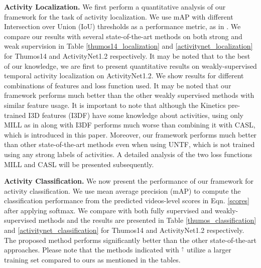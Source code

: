 \documentclass[runningheads]{llncs}
\begin{document}
\textbf{Activity Localization.} We first perform a quantitative analysis of our framework for the task of activity localization. We use mAP with different Intersection over Union (IoU) thresholds as a performance metric, as in \cite{idrees2017thumos}. We compare our results with several state-of-the-art methods on both strong and weak supervision in Table \ref{thumos14_localization} and \ref{activitynet_localization} for Thumos14 and ActivityNet1.2 respectively. It may be noted that to the best of our knowledge, we are first to present quantitative results on weakly-supervised temporal activity localization on ActivityNet1.2. We show results for different combinations of features and loss function used. It may be noted that our framework performs much better than the other weakly supervised methods with similar feature usage. It is important to note that although the Kinetics pre-trained I3D features (I3DF) have some knowledge about activities, using only MILL as in \cite{wang2017untrimmednets} along with I3DF performs much worse than combining it with CASL, which is introduced in this paper. Moreover, our framework performs much better than other state-of-the-art methods even when using UNTF, which is not trained using any strong labels of activities. A detailed analysis of the two loss functions MILL and CASL will be presented subsequently.  

\textbf{Activity Classification.}
We now present the performance of our framework for activity classification. We use mean average precision (mAP) to compute the classification performance from the predicted videos-level scores in Eqn. \ref{scores} after applying softmax. We compare with both fully supervised and weakly-supervised methods and the results are presented in Table \ref{thumos_classification} and \ref{activitynet_classification} for Thumos14 and ActivityNet1.2 respectively. The proposed method performs significantly better than the other state-of-the-art approaches. Please note that the methods indicated with $^\uparrow$ utilize a larger training set compared to ours as mentioned in the tables. 
\end{document}
